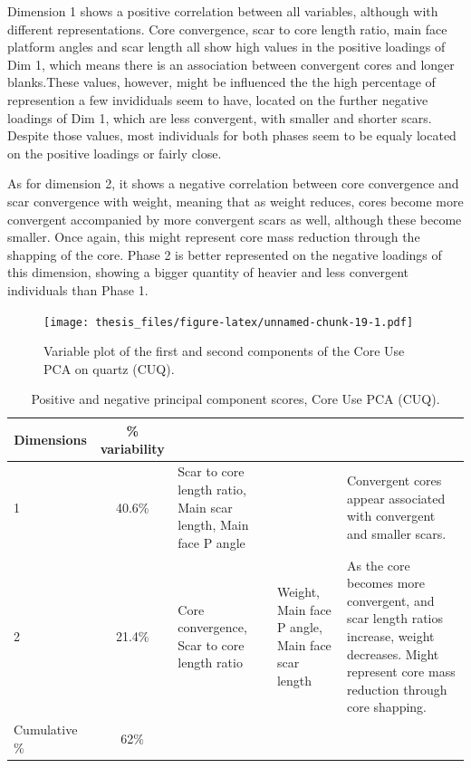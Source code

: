 \documentclass[12pt,twoside]{reedthesis}
\begin{document}
Dimension 1 shows a positive correlation between all variables, although with different representations. Core convergence, scar to core length ratio, main face platform angles and scar length all show high values in the positive loadings of Dim 1, which means there is an association between convergent cores and longer blanks.These values, however, might be influenced the the high percentage of represention a few invididuals seem to have, located on the further negative loadings of Dim 1, which are less convergent, with smaller and shorter scars. Despite those values, most individuals for both phases seem to be equaly located on the positive loadings or fairly close.

As for dimension 2, it shows a negative correlation between core convergence and scar convergence with weight, meaning that as weight reduces, cores become more convergent accompanied by more convergent scars as well, although these become smaller. Once again, this might represent core mass reduction through the shapping of the core. Phase 2 is better represented on the negative loadings of this dimension, showing a bigger quantity of heavier and less convergent individuals than Phase 1.
\begin{figure}
\centering
\texttt{[image: thesis\_files/figure-latex/unnamed-chunk-19-1.pdf]}
\caption{\label{fig:unnamed-chunk-19}Variable plot of the first and second components of the Core Use PCA on quartz (CUQ).}
\end{figure}
\begin{table}[!h]

\caption{\label{tab:unnamed-chunk-20}Positive and negative principal component scores, Core Use PCA (CUQ).}
\centering
\begin{tabular}[t]{lc>{\raggedright\arraybackslash}p{3cm}>{\raggedright\arraybackslash}p{3cm}>{\raggedright\arraybackslash}p{3cm}}
\toprule
\multicolumn{1}{c}{\textbf{Dimensions}} & \multicolumn{1}{c}{\textbf{\% variability}} & \multicolumn{1}{>{\centering\arraybackslash}p{3cm}}{\textbf{+}} & \multicolumn{1}{>{\centering\arraybackslash}p{3cm}}{\textbf{-}} & \multicolumn{1}{>{\centering\arraybackslash}p{3cm}}{\textbf{Interpretation}}\\
\midrule
1 & 40.6\% & Scar to core length ratio, Main scar length, Main face P angle &  & Convergent cores appear associated with convergent and smaller scars.\\
2 & 21.4\% & Core convergence, Scar to core length ratio & Weight, Main face P angle, Main face scar length & As the core becomes more convergent, and scar length ratios increase, weight decreases. Might represent core mass reduction through core shapping.\\
Cumulative \% & 62\% &  &  & \\
\bottomrule
\end{tabular}
\end{table}
\end{document}
